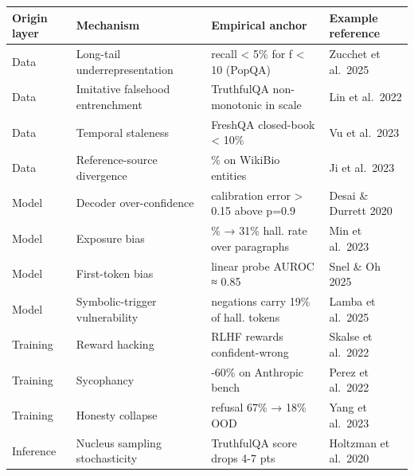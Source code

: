 {\def\LTcaptype{none} %
\begin{longtable}[]{@{}
  >{\raggedright\arraybackslash}p{}
  >{\raggedright\arraybackslash}p{}
  >{\raggedright\arraybackslash}p{}
  >{\raggedright\arraybackslash}p{}@{}}
\toprule\noalign{}
\begin{minipage}[b]{\linewidth}\raggedright
Origin layer
\end{minipage} & \begin{minipage}[b]{\linewidth}\raggedright
Mechanism
\end{minipage} & \begin{minipage}[b]{\linewidth}\raggedright
Empirical anchor
\end{minipage} & \begin{minipage}[b]{\linewidth}\raggedright
Example reference
\end{minipage} \\
\midrule\noalign{}
\endhead
\bottomrule\noalign{}
\endlastfoot
Data & Long-tail underrepresentation & recall \textless{} 5\% for f \textless{} 10 (PopQA) & Zucchet et al.~2025 \\
Data & Imitative falsehood entrenchment & TruthfulQA non-monotonic in scale & Lin et al.~2022 \\
Data & Temporal staleness & FreshQA closed-book \textless{} 10\% & Vu et al.~2023 \\
Data & Reference-source divergence & 23\% on WikiBio entities & Ji et al.~2023 \\
Model & Decoder over-confidence & calibration error \textgreater{} 0.15 above p=0.9 & Desai \& Durrett 2020 \\
Model & Exposure bias & 12\% → 31\% hall. rate over paragraphs & Min et al.~2023 \\
Model & First-token bias & linear probe AUROC ≈ 0.85 & Snel \& Oh 2025 \\
Model & Symbolic-trigger vulnerability & negations carry 19\% of hall. tokens & Lamba et al.~2025 \\
Training & Reward hacking & RLHF rewards confident-wrong & Skalse et al.~2022 \\
Training & Sycophancy & 40-60\% on Anthropic bench & Perez et al.~2022 \\
Training & Honesty collapse & refusal 67\% → 18\% OOD & Yang et al.~2023 \\
Inference & Nucleus sampling stochasticity & TruthfulQA score drops 4-7 pts & Holtzman et al.~2020 \\
\end{longtable}
}

